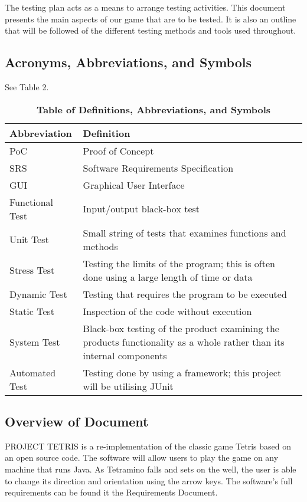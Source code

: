 \documentclass[12pt, titlepage]{article}
\begin{document}
The testing plan acts as a means to arrange testing activities. This document presents the main aspects of our game that are to be tested. It is also an outline that will be followed of the different testing methods and tools used throughout.
\subsection{Acronyms, Abbreviations, and Symbols}
See Table 2.
\begin{table}[!h]
\caption{\textbf{Table of Definitions, Abbreviations, and Symbols}} \label{Table}
\begin{tabularx}{\textwidth}{p{3cm}X}
\toprule
\textbf{Abbreviation} & \textbf{Definition} \\
\midrule
PoC & Proof of Concept\\
SRS & Software Requirements Specification\\
GUI & Graphical User Interface\\
Functional Test & Input/output black-box test\\
Unit Test & Small string of tests that examines functions and methods\\
Stress Test & Testing the limits of the program; this is often done using a large length of time or data\\
Dynamic Test & Testing that requires the program to be executed\\
Static Test & Inspection of the code without execution\\
System Test & Black-box testing of the product examining the products functionality as a whole rather than its internal components\\
Automated Test & Testing done by using a framework; this project will be utilising JUnit \\
\bottomrule
\end{tabularx}
\end{table}

\subsection{Overview of Document}
PROJECT TETRIS is a re-implementation of the classic game Tetris based on an open source code. The software will allow users to play the game on any machine that runs Java. As Tetramino falls and sets on the well, the user is able to change its direction and orientation using the arrow keys. The software's full requirements can be found it the Requirements Document.
\end{document}
